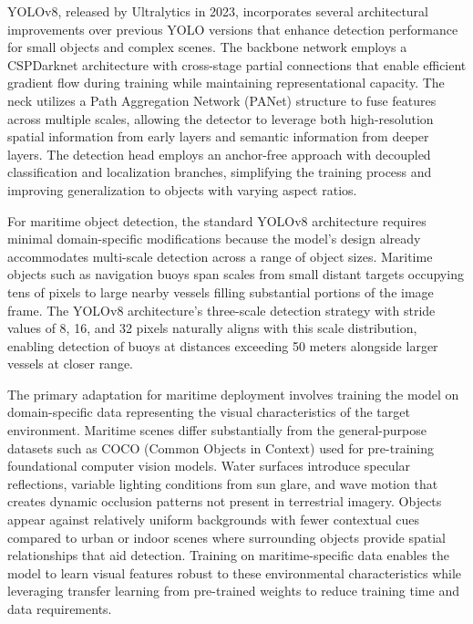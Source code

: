 YOLOv8, released by Ultralytics in 2023, incorporates several architectural improvements over previous YOLO versions that enhance detection performance for small objects and complex scenes.
The backbone network employs a CSPDarknet architecture with cross-stage partial connections that enable efficient gradient flow during training while maintaining representational capacity.
The neck utilizes a Path Aggregation Network (PANet) structure to fuse features across multiple scales, allowing the detector to leverage both high-resolution spatial information from early layers and semantic information from deeper layers.
The detection head employs an anchor-free approach with decoupled classification and localization branches, simplifying the training process and improving generalization to objects with varying aspect ratios.

For maritime object detection, the standard YOLOv8 architecture requires minimal domain-specific modifications because the model's design already accommodates multi-scale detection across a range of object sizes.
Maritime objects such as navigation buoys span scales from small distant targets occupying tens of pixels to large nearby vessels filling substantial portions of the image frame.
The YOLOv8 architecture's three-scale detection strategy with stride values of 8, 16, and 32 pixels naturally aligns with this scale distribution, enabling detection of buoys at distances exceeding 50 meters alongside larger vessels at closer range.

The primary adaptation for maritime deployment involves training the model on domain-specific data representing the visual characteristics of the target environment.
Maritime scenes differ substantially from the general-purpose datasets such as COCO (Common Objects in Context) used for pre-training foundational computer vision models.
Water surfaces introduce specular reflections, variable lighting conditions from sun glare, and wave motion that creates dynamic occlusion patterns not present in terrestrial imagery.
Objects appear against relatively uniform backgrounds with fewer contextual cues compared to urban or indoor scenes where surrounding objects provide spatial relationships that aid detection.
Training on maritime-specific data enables the model to learn visual features robust to these environmental characteristics while leveraging transfer learning from pre-trained weights to reduce training time and data requirements.

